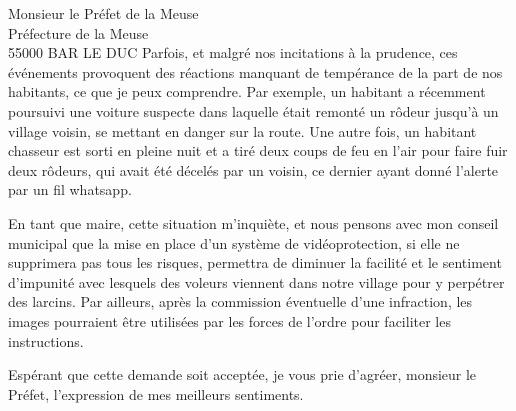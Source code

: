 \documentclass[12pt]{lettre}
\begin{document}
\begin{letter}{Monsieur le Préfet de la Meuse\\Préfecture de la Meuse\\55000 BAR LE DUC}
Parfois, et malgré nos incitations à la prudence, ces événements provoquent des réactions manquant de tempérance de la part de nos habitants, ce que je peux comprendre. Par exemple, un habitant a récemment poursuivi une voiture suspecte dans laquelle était remonté un rôdeur jusqu'à un village voisin, se mettant en danger sur la route. Une autre fois, un habitant chasseur est sorti en pleine nuit et a tiré deux coups de feu en l'air pour faire fuir deux rôdeurs, qui avait été décelés par un voisin, ce dernier ayant donné l'alerte par un fil whatsapp.

En tant que maire, cette situation m'inquiète, et nous pensons avec mon conseil municipal que la mise en place d'un système de vidéoprotection, si elle ne supprimera pas tous les risques, permettra de diminuer la facilité et le sentiment d'impunité avec lesquels des voleurs viennent dans notre village pour y perpétrer des larcins. Par ailleurs, après la commission éventuelle d'une infraction, les images pourraient être utilisées par les forces de l'ordre pour faciliter les instructions.

Espérant que cette demande soit acceptée, je vous prie d'agréer, monsieur le Préfet, l'expression de mes meilleurs sentiments.


\end{letter} 
\end{document}
